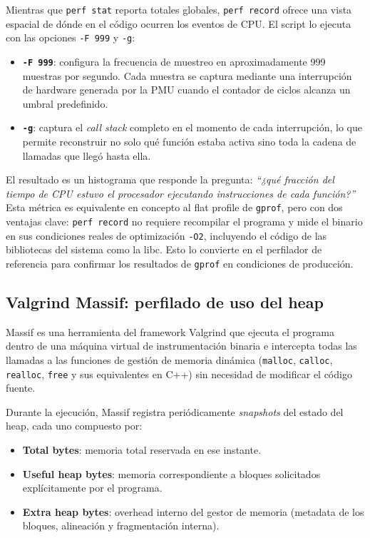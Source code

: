 Mientras que \texttt{perf stat} reporta totales globales, \texttt{perf record}
ofrece una vista espacial de dónde en el código ocurren los eventos de CPU.
El script lo ejecuta con las opciones \texttt{-F~999} y \texttt{-g}:

\begin{itemize}
    \item \textbf{\texttt{-F 999}}: configura la frecuencia de muestreo en
        aproximadamente 999 muestras por segundo.
        Cada muestra se captura mediante una interrupción de hardware generada por
        la PMU cuando el contador de ciclos alcanza un umbral predefinido.
    \item \textbf{\texttt{-g}}: captura el \textit{call stack} completo en el
        momento de cada interrupción, lo que permite reconstruir no solo qué
        función estaba activa sino toda la cadena de llamadas que llegó hasta ella.
\end{itemize}

El resultado es un histograma que responde la pregunta: \textit{``¿qué fracción
del tiempo de CPU estuvo el procesador ejecutando instrucciones de cada
función?''}
Esta métrica es equivalente en concepto al flat profile de \texttt{gprof}, pero
con dos ventajas clave: \texttt{perf record} no requiere recompilar el programa y
mide el binario en sus condiciones reales de optimización \texttt{-O2}, incluyendo
el código de las bibliotecas del sistema como la libc.
Esto lo convierte en el perfilador de referencia para confirmar los resultados de
\texttt{gprof} en condiciones de producción.


\subsection{Valgrind Massif: perfilado de uso del heap}

Massif es una herramienta del framework Valgrind que ejecuta el programa dentro de
una máquina virtual de instrumentación binaria e intercepta todas las llamadas a
las funciones de gestión de memoria dinámica (\texttt{malloc}, \texttt{calloc},
\texttt{realloc}, \texttt{free} y sus equivalentes en C++) sin necesidad de
modificar el código fuente.

Durante la ejecución, Massif registra periódicamente \textit{snapshots} del estado
del heap, cada uno compuesto por:

\begin{itemize}
    \item \textbf{Total bytes}: memoria total reservada en ese instante.
    \item \textbf{Useful heap bytes}: memoria correspondiente a bloques solicitados
        explícitamente por el programa.
    \item \textbf{Extra heap bytes}: overhead interno del gestor de memoria
        (metadata de los bloques, alineación y fragmentación interna).
\end{itemize}

